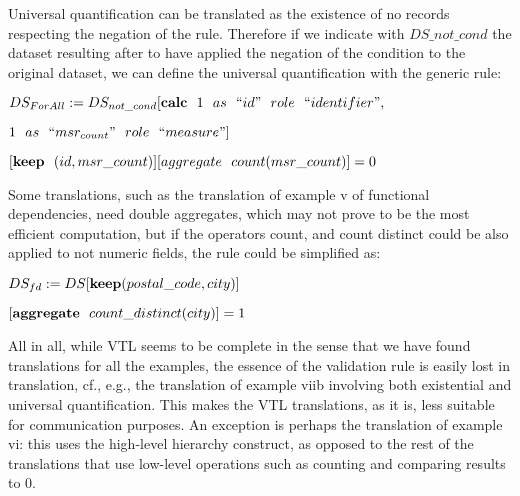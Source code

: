 \bigskip\noindent
Universal quantification can be translated as the existence of no records respecting the negation of the rule.  Therefore if we indicate with
$DS\_{not\_cond}$
the  dataset  resulting  after  to  have  applied  the  negation  of  the  condition to the original dataset, we can define the universal quantification with the generic rule:

\bigskip
 $ DS_{ForAll}:=DS_{not\_cond}[\bold{calc} \ \ 1 \ \ as  \ \ ``id"  \ \ role  \ \ ``identifier" , $

\hskip 2cm  $ 1 \ \ as  \ \ ``msr_{count}"  \ \ role  \ \ ``measure"] $  


\hskip 2cm $ [\bold{keep} \ \ (id, msr\_{count})][aggregate\ \ count(msr\_{count})]=0$ 

\bigskip\noindent
Some translations, such as the translation of example v of functional dependencies, need double aggregates, which may not prove to be the most efficient computation, but if the operators count, and count distinct could be also applied to not numeric fields, the rule could be simplified as:

\bigskip
$DS_{fd}:=DS[\bold{keep} (postal\_code,city)]$  

\hskip 2cm  $  [\bold{aggregate} \ \ count\_distinct(city)]=1 $  

\bigskip\noindent

All in all,  while VTL seems to be complete in the sense that we have found translations  for  all  the  examples,  the  essence  of  the  validation  rule is easily lost in  translation,  cf.,  e.g.,  the  translation  of  example  viib  involving both existential and universal quantification.  This makes the VTL translations, as it is, less suitable for communication purposes. An exception is perhaps the translation of example vi:  this uses the high-level hierarchy construct, as opposed to the rest of the translations that use low-level operations such as counting and comparing results to 0.